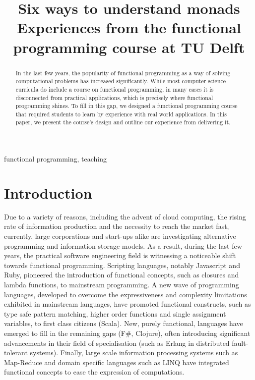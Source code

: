 \documentclass[conference]{IEEEtran}
\begin{document}
\title{Six ways to understand monads\\
\small{Experiences from the functional programming course at TU Delft}}

\author{
}
\maketitle

\begin{abstract}

  In the last few years, the popularity of functional programming as a way of
  solving computational problems has increased significantly. While most
  computer science curricula do include a course on functional programming, in
  many cases it is disconnected from practical applications, which is
  precisely where functional programming shines. To fill in this gap, we
  designed a functional programming course that  required students to
  learn by experience with real world applications. In this paper, we present
  the course's design and outline our experience from delivering it.

\end{abstract}

\begin{IEEEkeywords}
functional programming, teaching
\end{IEEEkeywords}

\section{Introduction}

Due to a variety of reasons, including the advent of cloud computing, the
rising rate of information production and the necessity to reach the market
fast, currently, large corporations and start-ups alike are investigating
alternative programming and information storage models. As a result, during
the last few years, the practical software engineering field is witnessing a
noticeable shift towards functional programming. Scripting languages, notably
Javascript and Ruby, pioneered the introduction of functional concepts, such as
closures and lambda functions, to mainstream programming. A new wave of
programming languages, developed to overcome the expressiveness and
complexity limitations exhibited in mainstream languages, have promoted
functional constructs, such as type safe pattern matching, higher order
functions and single assignment variables, to first class citizens (Scala).
New, purely functional, languages have emerged to fill in the remaining gaps
(F\#, Clojure), often introducing significant advancements in their field of
specialisation (such as Erlang in distributed fault-tolerant systems).
Finally, large scale information processing systems such as Map-Reduce and
domain specific languages such as LINQ have integrated functional concepts to
ease the expression of computations.
\end{document}
